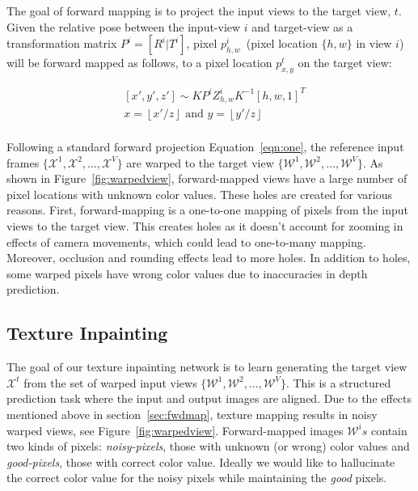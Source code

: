 \documentclass[runningheads]{llncs}
\begin{document}
The goal of forward mapping is to project the input views to the target view, $t$. Given the relative pose between the input-view $i$ and target-view as a transformation matrix $P^{i} = [R^{i}|T^{i}]$, pixel $p_{h,w}^{i}$~(pixel location $\{h,w\}$ in view $i$) will be forward mapped as follows, to a pixel location $p^{t}_{x,y}$ on the target view:

\begin{equation}
\begin{aligned}
&\left[x',y',z' \right] \sim  KP^{i}Z^{i}_{h,w}K^{-1}[h,w,1]^{T} \\
&x = \left \lfloor{x'/z}\right \rfloor \text{ and } y = \left \lfloor{y'/z}\right \rfloor \\
\end{aligned}
\label{eqn:one}
\end{equation}

Following a standard forward projection Equation~\ref{eqn:one}, the reference input frames $\{\mathcal{X}^{1}, \mathcal{X}^{2}, \dots, \mathcal{X}^{V}\} $ are warped to the target view $\{\mathcal{W}^{1}, \mathcal{W}^{2}, \dots, \mathcal{W}^{V}\}$. As shown in Figure~\ref{fig:warpedview}, forward-mapped views have a large number of pixel locations with unknown color values. These holes are created for various reasons. First, forward-mapping is a one-to-one mapping of pixels from the input views to the target view. This creates holes as it doesn't account for zooming in effects of camera movements, which could lead to one-to-many mapping. Moreover, occlusion and rounding effects lead to more holes. In addition to holes, some warped pixels have wrong color values due to inaccuracies in depth prediction.

\subsection{Texture Inpainting}
The goal of our texture inpainting network is to learn generating the target view $\mathcal{X}^{t}$ from the set of warped input views $\{\mathcal{W}^{1}, \mathcal{W}^{2}, \dots, \mathcal{W}^{V}\}$. This is a structured prediction task where the input and output images are aligned. Due to the effects mentioned above in section~\ref{sec:fwdmap}, texture mapping results in noisy warped views, see Figure~\ref{fig:warpedview}. Forward-mapped images $\mathcal{W}^{i}s$ contain two kinds of pixels: \textit{noisy-pixels}, those with unknown (or wrong) color values and \textit{good-pixels}, those with correct color value. Ideally we would like to hallucinate the correct color value for the noisy pixels while maintaining the \textit{good} pixels.%
\end{document}
